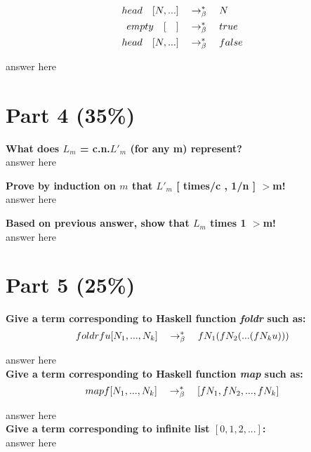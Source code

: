 \documentclass{article}
\begin{document}
	\begin{align*}
		head \quad [ N, ...] &\quad \rightarrow_\beta^*\quad  N\\
		empty \quad [\quad] &\quad \rightarrow_\beta^*\quad true\\
		head \quad [ N, ...] &\quad \rightarrow_\beta^*\quad false
	\end{align*}
	
	answer here
	
	
	\section{Part 4 (35\%)}

	\textbf{What does $L_m$ = \lamb c.\lamb n.$L'_m$ (for any m) represent?}\\
	
	answer here
	\newline
	
	\textbf{Prove by induction on $m$ that $L'_m$ [ times/c , 1/n ] $>$\be \quad m!}\\
	
	answer here
	\newline
	
	\textbf{Based on previous answer, show that $L_m$ times 1  $>$\be \quad m!}\\
	
	answer here
	
	
	\section{Part 5 (25\%)}
	
	\textbf{Give a \lamb term corresponding to Haskell function \textit{foldr} such as:}\\
	
	\begin{equation*}
		foldr  f  u [N_1,...,N_k] \quad \rightarrow_\beta^*\quad f N_1(f N_2(...(f N_k u)))
	\end{equation*}
	
	answer here\\
	
	\textbf{Give a \lamb term corresponding to Haskell function \textit{map} such as:}\\
	
	\begin{equation*}
		map  f [N_1,...,N_k] \quad \rightarrow_\beta^*\quad [f N_1,f N_2,...,f N_k]
	\end{equation*}
	
	answer here\\
	
	\textbf{Give a \lamb term corresponding to infinite list $[0,1,2,...]$:}\\
	
	answer here
\end{document}
